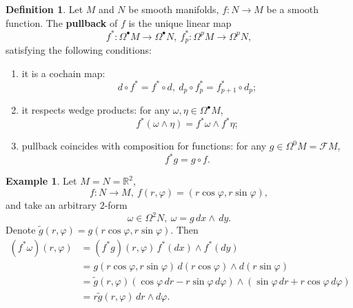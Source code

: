 \documentclass{elsarticle}
\theoremstyle{definition}
\newtheorem{definition}[theorem]{Definition}
\newtheorem{example}[theorem]{Example}
\newcommand{\R}{\mathbb{R}}
\newcommand{\newterm}[1]{\textbf{#1}}
\begin{document}
\begin{definition}
  Let $M$ and $N$ be smooth manifolds, $f \colon N \to M$ be a smooth function.
  The \newterm{pullback} of $f$ is the unique linear map
  \begin{equation}
    f^* \colon \Omega^\bullet M \to \Omega^\bullet N,\ f^*_p \colon \Omega^p M \to \Omega^p N,
  \end{equation}
  satisfying the following conditions:
  \begin{enumerate}
    \item
      it is a cochain map:
      \begin{equation}
        d \circ f^* = f^* \circ d,\ d_p \circ f^*_p = f^*_{p + 1} \circ d_p;
      \end{equation}
    \item
      it respects wedge products:
      for any $\omega, \eta \in \Omega^\bullet M$,
      \begin{equation}
        f^*(\omega \wedge \eta) = f^* \omega \wedge f^* \eta;
      \end{equation}
    \item
      pullback coincides with composition for functions:
      for any $g \in \Omega^0 M = \mathcal{F} M$,
      \begin{equation}
        f^* g = g \circ f.
      \end{equation}
  \end{enumerate}
\end{definition}
\begin{example}
  Let $M = N = \R^2$,
  \begin{equation}
    f \colon N \to M,\ f(r, \varphi) = (r \cos \varphi, r \sin \varphi),
  \end{equation}
  and take an arbitrary $2$-form
  \begin{equation}
    \omega \in \Omega^2 N,\ \omega = g\, d x \wedge \, d y.
  \end{equation}
  Denote $\tilde{g}(r, \varphi) = g(r \cos \varphi, r \sin \varphi)$.
  Then
  \begin{equation}
    \begin{split}
    (f^* \omega)(r, \varphi)
    & = (f^* g)(r, \varphi)\, f^*(d x) \wedge f^*(d y) \\
    & = g(r \cos \varphi, r \sin \varphi)\, d(r \cos \varphi) \wedge d(r \sin \varphi) \\
    & = \tilde{g}(r, \varphi) (\cos \varphi\, d r - r \sin \varphi\, d \varphi) \wedge (\sin \varphi\, d r + r \cos \varphi\, d \varphi) \\
    & = r \tilde{g}(r, \varphi)\, d r \wedge d \varphi.
    \end{split}
  \end{equation}
\end{example}
\end{document}
